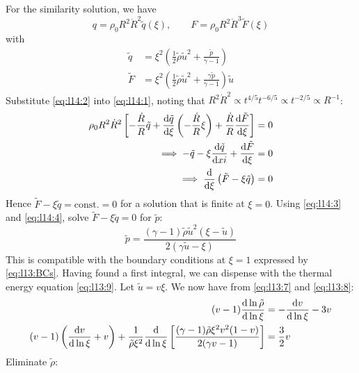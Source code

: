 \documentclass{jknotes}
\begin{document}
For the similarity solution, we have
\begin{equation}
	q = \rho_0 R^2 \dot{R}^2 \tilde{q}(\xi), \hspace{2em} F = \rho_0 R^2
	\dot{R}^3 \tilde{F}(\xi) \label{eq:l14:2}
\end{equation}
with
\begin{align}
	\tilde{q} &= \xi^2 \left( \frac{1}{2}\tilde{\rho}\tilde{u}^2 +
	\frac{\tilde{p}}{\gamma -1}\right) \label{eq:l14:3}\\
	\tilde{F} &= \xi^2 \left( \frac{1}{2}\tilde{\rho}\tilde{u}^2 +
	\frac{\gamma \tilde{p}}{\gamma -1}\right) \tilde{u}\label{eq:l14:4}
\end{align}
Substitute \eqref{eq:l14:2} into \eqref{eq:l14:1}, noting that $R^2 \dot{R}^2
\propto t^{4/5} t^{-6/5} \propto t^{-2/5} \propto R^{-1}$:
\begin{align}
	\rho_0 R^2 \dot{R}^2 \left[ -\frac{\dot{R}}{R} \tilde{q} + \frac{\diffd
	\tilde{q}}{\diffd \xi} \left( -\frac{\dot{R}}{R} \xi \right) +
	\frac{\dot{R}}{R} \frac{\diffd \tilde{F}}{\diffd \xi}\right] &= 0 \\
	\implies -\tilde{q} - \xi \frac{\diffd \tilde{q}}{\diffd xi} +
	\frac{\diffd \tilde{F}}{\diffd \xi} &= 0  \\
	\implies \frac{\diffd}{\diffd \xi} \left( \tilde{F} - \xi \tilde{q}\right)
									   &= 0
\end{align}
Hence $\tilde{F} - \xi \tilde{q} = \text{const.} = 0$ for a solution that is
finite at $\xi = 0$. Using \eqref{eq:l14:3} and \eqref{eq:l14:4}, solve
$\tilde{F} - \xi \tilde{q} = 0$ for $\tilde{p}$:
\begin{equation}
	\tilde{p} = \frac{(\gamma - 1)\tilde{\rho}\tilde{u}^2(\xi -
	\tilde{u})}{2(\gamma \tilde{u} - \xi)}
\end{equation}
This is compatible with the boundary conditions at $\xi = 1$ expressed by
\eqref{eq:l13:BCs}. Having found a first integral, we can dispense with the
thermal energy equation \eqref{eq:l13:9}. Let $\tilde{u} = v \xi$. We now have
from \eqref{eq:l13:7} and \eqref{eq:l13:8}:
\begin{align}
	(v-1)\frac{\diffd \ln \tilde{\rho}}{\diffd \ln \xi} &= -\frac{\diffd
	v}{\diffd \ln \xi} - 3v \\
	(v-1)\left( \frac{\diffd v}{\diffd \ln \xi}+ v\right) + \frac{1}{\tilde{\rho}\xi^2}
	\frac{\diffd}{\diffd \ln \xi} \left[ \frac{(\gamma -1)\tilde{\rho} \xi^2
	v^2 (1-v)}{2(\gamma v-1)}\right] &= \frac{3}{2}v
\end{align}
Eliminate $\tilde{\rho}$:
\end{document}
